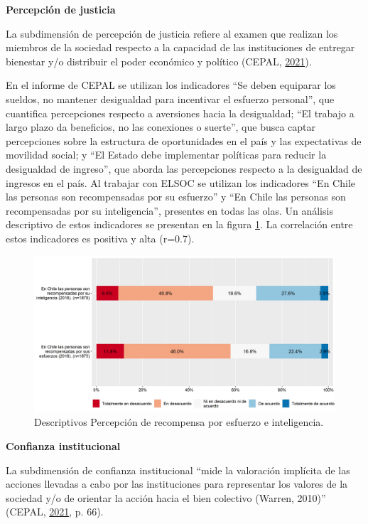 \documentclass[
  12pt,
]{book}
\begin{document}
\textbf{Percepción de justicia}

La subdimensión de percepción de justicia refiere al examen que realizan los miembros de la sociedad respecto a la capacidad de las instituciones de entregar bienestar y/o distribuir el poder económico y político (CEPAL, \protect\hyperlink{ref-cepal_Cohesion_2021}{2021}).

En el informe de CEPAL se utilizan los indicadores ``Se deben equiparar los sueldos, no mantener desigualdad para incentivar el esfuerzo personal'', que cuantifica percepciones respecto a aversiones hacia la desigualdad; ``El trabajo a largo plazo da beneficios, no las conexiones o suerte'', que busca captar percepciones sobre la estructura de oportunidades en el país y las expectativas de movilidad social; y ``El Estado debe implementar políticas para reducir la desigualdad de ingreso'', que aborda las percepciones respecto a la desigualdad de ingresos en el país. Al trabajar con ELSOC se utilizan los indicadores ``En Chile las personas son recompensadas por su esfuerzo'' y ``En Chile las personas son recompensadas por su inteligencia'', presentes en todas las olas. Un análisis descriptivo de estos indicadores se presentan en la figura \ref{fig:justicia}. La correlación entre estos indicadores es positiva y alta (r=0.7).

\begin{figure}[H]

{\centering \includegraphics[width=1\linewidth,height=1\textheight]{output/graphs/justicia} 

}

\caption{Descriptivos Percepción de recompensa por esfuerzo e inteligencia.}\label{fig:justicia}
\end{figure}

\textbf{Confianza institucional}

La subdimensión de confianza institucional ``mide la valoración implícita de las acciones llevadas a cabo por las instituciones para representar los valores de la sociedad y/o de orientar la acción hacia el bien colectivo (Warren, 2010)'' (CEPAL, \protect\hyperlink{ref-cepal_Cohesion_2021}{2021}, p. 66).
\end{document}
